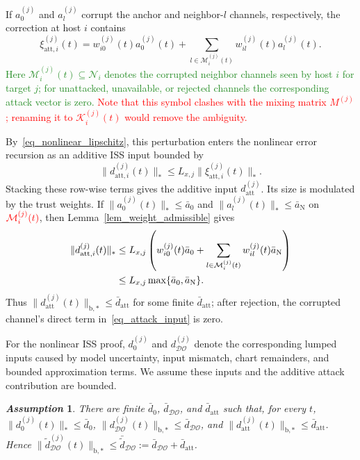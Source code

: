 \documentclass[letterpaper,journal]{IEEEtran}
\def\N{\mathcal{N}} %
\def\DO{\mathcal{DO}} %
\newtheorem{assumption}{\it Assumption}%
\newcommand{\azrevcolor}{ForestGreen}
\newcommand{\azrev}[1]{\textcolor{\azrevcolor}{#1}}
\begin{document}
If $a_0^{(j)}$ and $a_l^{(j)}$ corrupt the anchor and neighbor-$l$ channels, respectively, the correction at host $i$ contains
{\small
\begin{equation}
\xi_{\mathrm{att},i}^{(j)}(t)
=w_{i0}^{(j)}(t)a_{0}^{(j)}(t)
+\sum_{l\in\mathcal{M}_{i}^{(j)}(t)}w_{il}^{(j)}(t)a_{l}^{(j)}(t).
\label{eq_attack_input}
\end{equation}
}
\azrev{Here $\mathcal{M}_i^{(j)}(t)\subseteq\N_i$ denotes the corrupted neighbor channels seen by host $i$ for target $j$; for unattacked, unavailable, or rejected channels the corresponding attack vector is zero. \textcolor{red}{Note that this symbol clashes with the mixing matrix $M^{(j)}$; renaming it to $\mathcal{K}_i^{(j)}(t)$ would remove the ambiguity.}}

By~\eqref{eq_nonlinear_lipschitz}, this perturbation enters the nonlinear error recursion as an additive ISS input bounded by
\begin{equation}
\|d_{\mathrm{att},i}^{(j)}(t)\|_*
\le L_{x,j}\|\xi_{\mathrm{att},i}^{(j)}(t)\|_* .
\label{eq_attack_lipschitz_bound}
\end{equation}
Stacking these row-wise terms gives the additive input $d_{\mathrm{att}}^{(j)}$. Its size is modulated by the trust weights.
If $\|a_{0}^{(j)}(t)\|_*\le \bar a_0$ and $\|a_{l}^{(j)}(t)\|_*\le \bar a_{\mathrm{N}}$ on ${\color{red}\mathcal{M}_{i}^{(j)}(t)}$, then Lemma~\ref{lem_weight_admissible} gives
\begin{align}
\|d_{\mathrm{att},i}^{(j)}(t)\|_*
&\le L_{x,j}
\left(
w_{i0}^{(j)}(t)\bar a_0
+\sum_{l\in\mathcal{M}_{i}^{(j)}(t)}
w_{il}^{(j)}(t)\bar a_{\mathrm{N}}
\right) \notag\\
&\le L_{x,j}\max\{\bar a_0,\bar a_{\mathrm{N}}\}.
\label{eq_attack_bound}
\end{align}
Thus $\|d_{\mathrm{att}}^{(j)}(t)\|_{\mathrm{b},*}\le\bar d_{\mathrm{att}}$ for some finite $\bar d_{\mathrm{att}}$; after rejection, the corrupted channel's direct term in~\eqref{eq_attack_input} is zero.

For the nonlinear ISS proof, $d_0^{(j)}$ and $d_{\DO}^{(j)}$ denote the corresponding lumped inputs caused by model uncertainty, input mismatch, chart remainders, and bounded approximation terms. We assume these inputs and the additive attack contribution are bounded.
\begin{assumption}\label{assum_distur}
There are finite $\bar d_0$, $\bar d_{\DO}$, and $\bar d_{\mathrm{att}}$ such that, for every $t$, $\|d_0^{(j)}(t)\|_*\le\bar d_0$, $\|d_{\DO}^{(j)}(t)\|_{\mathrm{b},*}\le\bar d_{\DO}$, and $\|d_{\mathrm{att}}^{(j)}(t)\|_{\mathrm{b},*}\le\bar d_{\mathrm{att}}$. Hence $\|\tilde d_{\DO}^{(j)}(t)\|_{\mathrm{b},*}\le\bar{\tilde d}_{\DO}:=\bar d_{\DO}+\bar d_{\mathrm{att}}$.
\end{assumption}
\end{document}

